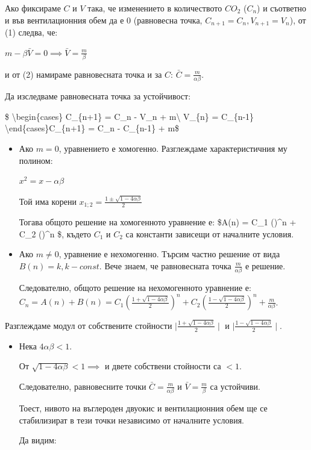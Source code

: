 \documentclass[11pt]{article}
\begin{document}
Ако фиксираме \(C\) и \(V\) така, че изменението в количеството \(CO_2\)
(\(C_n\)) и съответно и във вентилационния обем да е 0 (равновесна
точка, \(C_{n+1} = C_n, V_{n+1}=V_n\)), от (1) следва, че:

\(m - \beta \bar{V} = 0 \implies \bar{V} = \frac{m}{\beta}\)

и от (2) намираме равновесната точка и за \(C\):
\(\bar{C} = \frac{m}{\alpha \beta}\).

    Да изследваме равновесната точка за устойчивост:

\$ \textbackslash{}begin\{cases\} C\_\{n+1\} = C\_n - \beta V\_n +
m\textbackslash{} V\_\{n\} = \alpha C\_\{n-1\}
\textbackslash{}end\{cases\}\implies \quad C\_\{n+1\} = C\_n -
\alpha \beta C\_\{n-1\} + m\$

\begin{itemize}
\item
  Ако \(m = 0\), уравнението е хомогенно. Разглеждаме характеристичния
  му полином:

  \(x^2 = x - \alpha \beta\)

  Той има корени \(x_{1;2} = \frac{1 \pm \sqrt{1 - 4 \alpha \beta}}{2}\)

  Тогава общото решение на хомогенното уравнение е: \$A(n) = C\_1
  ()\^{}n + C\_2
  ()\^{}n \$, където \(C_1\) и
  \(C_2\) са константи зависещи от началните условия.
\item
  Ако \(m \neq 0\), уравнение е нехомогенно. Търсим частно решение от
  вида \(B(n) = k, k - const\). Вече знаем, че равновесната точка
  \(\frac{m}{\alpha \beta}\) е решение.

  Следователно, общото решение на нехомогенното уравнение е:
  \(C_n = A(n) + B(n) = C_1 (\frac{1 + \sqrt{1 - 4 \alpha \beta}}{2})^n + C_2 (\frac{1 - \sqrt{1 - 4 \alpha \beta}}{2})^n + \frac{m}{\alpha \beta}\).
\end{itemize}

    Разглеждаме модул от собствените стойности
\(\mid\frac{1 + \sqrt{1 - 4 \alpha \beta}}{2}\mid\) и
\(\mid\frac{1 - \sqrt{1 - 4 \alpha \beta}}{2}\mid\).

\begin{itemize}
\item
  Нека \(4\alpha \beta < 1\).

  От \(\sqrt{1 - 4 \alpha \beta} < 1 \implies\) и двете собствени
  стойности са \(< 1\).

  Следователно, равновесните точки \(\bar{C} = \frac{m}{\alpha \beta}\)
  и \(\bar{V} = \frac{m}{\beta}\) са устойчиви.

  Тоест, нивото на въглероден двуокис и вентилационния обем ще се
  стабилизират в тези точки независимо от началните условия.

  Да видим:
\end{itemize}
\end{document}
